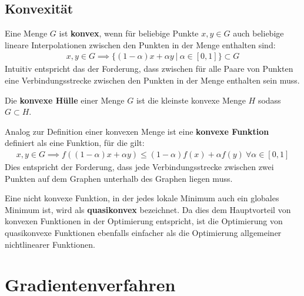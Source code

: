 \documentclass{report}
\newcommand{\tbf}{\textbf}
\newcommand*{\newpar}{\par\vspace{\baselineskip}\noindent}
\begin{document}
\section{Konvexität}
Eine Menge $G$ ist \tbf{konvex}, wenn für beliebige Punkte $x,y \in G$ auch beliebige lineare Interpolationen zwischen den Punkten in der Menge enthalten sind:
\begin{align*}
 x,y \in G \implies \{(1-\alpha)x + \alpha y\ |\ \alpha \in [0,1]\} \subset G
\end{align*}
Intuitiv entspricht das der Forderung, dass zwischen für alle Paare von Punkten eine Verbindungsstrecke zwischen den Punkten in der Menge enthalten sein muss.
\newpar
Die \tbf{konvexe Hülle} einer Menge $G$ ist die kleinste konvexe Menge $H$ sodass $G \subset H$.
\newpar
Analog zur Definition einer konvexen Menge ist eine \tbf{konvexe Funktion} definiert als eine Funktion, für die gilt:
\begin{align*}
 x,y \in G \implies f((1-\alpha)x+\alpha y) \leq (1-\alpha)f(x) + \alpha f(y)\ \forall \alpha \in [0,1]
\end{align*}
Dies entspricht der Forderung, dass jede Verbindungsstrecke zwischen zwei Punkten auf dem Graphen unterhalb des Graphen liegen muss.
\newpar
Eine nicht konvexe Funktion, in der jedes lokale Minimum auch ein globales Minimum ist, wird als \tbf{quasikonvex} bezeichnet. Da dies dem Hauptvorteil von konvexen Funktionen in der Optimierung entspricht, ist die Optimierung von quasikonvexe Funktionen ebenfalls einfacher als die Optimierung allgemeiner nichtlinearer Funktionen.
\chapter{Gradientenverfahren}
\end{document}

